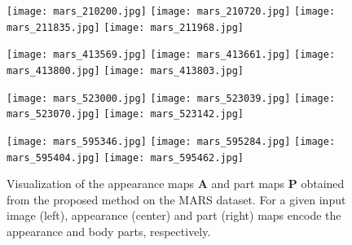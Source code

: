 \documentclass{llncs}
\begin{document}
\setcounter{figure}{6}
\begin{figure}[t]
\centering
	\begin{minipage}{0.99\linewidth}
	\begin{minipage}{0.24\linewidth}
\centering
      \texttt{[image: mars\_210200.jpg]}
      \texttt{[image: mars\_210720.jpg]}
      \texttt{[image: mars\_211835.jpg]}
      \texttt{[image: mars\_211968.jpg]}
    \end{minipage}
	\begin{minipage}{0.24\linewidth}
\centering
      \texttt{[image: mars\_413569.jpg]}
      \texttt{[image: mars\_413661.jpg]}
      \texttt{[image: mars\_413800.jpg]}
      \texttt{[image: mars\_413803.jpg]}
    \end{minipage}
	\begin{minipage}{0.24\linewidth}
\centering
      \texttt{[image: mars\_523000.jpg]}
      \texttt{[image: mars\_523039.jpg]}
      \texttt{[image: mars\_523070.jpg]}
      \texttt{[image: mars\_523142.jpg]}
    \end{minipage}
	\begin{minipage}{0.24\linewidth}
\centering
      \texttt{[image: mars\_595346.jpg]}
      \texttt{[image: mars\_595284.jpg]}
      \texttt{[image: mars\_595404.jpg]}
      \texttt{[image: mars\_595462.jpg]}
    \end{minipage}

    \end{minipage}
\vspace{-.2cm}
\caption{Visualization of the appearance maps $\mathbf{A}$ and part maps $\mathbf{P}$ obtained from the proposed method on the MARS dataset. For a given input image (left), appearance (center) and part (right) maps encode the appearance and body parts, respectively.}
\label{fig:vis_mars}
\end{figure}
\end{document}
